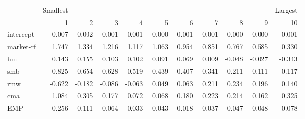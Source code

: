 \begin{tabular}{lrrrrrrrrrr}
      & \multicolumn{1}{l}{Smallest} & \multicolumn{1}{c}{-} & \multicolumn{1}{c}{-} & \multicolumn{1}{c}{-} & \multicolumn{1}{c}{-} & \multicolumn{1}{c}{-} & \multicolumn{1}{c}{-} & \multicolumn{1}{c}{-} & \multicolumn{1}{c}{-} & \multicolumn{1}{l}{Largest} \\
      & 1     & 2     & 3     & 4     & 5     & 6     & 7     & 8     & 9     & 10 \\
intercept & -0.007 & -0.002 & -0.001 & -0.001 & 0.000 & -0.001 & 0.001 & 0.000 & 0.000 & 0.001 \\
market-rf & 1.747 & 1.334 & 1.216 & 1.117 & 1.063 & 0.954 & 0.851 & 0.767 & 0.585 & 0.330 \\
hml   & 0.143 & 0.155 & 0.103 & 0.102 & 0.091 & 0.069 & 0.009 & -0.048 & -0.027 & -0.343 \\
smb   & 0.825 & 0.654 & 0.628 & 0.519 & 0.439 & 0.407 & 0.341 & 0.211 & 0.111 & 0.117 \\
rmw   & -0.622 & -0.182 & -0.086 & -0.063 & 0.049 & 0.063 & 0.211 & 0.234 & 0.196 & 0.140 \\
cma   & 1.084 & 0.305 & 0.177 & 0.072 & 0.068 & 0.180 & 0.223 & 0.214 & 0.162 & 0.325 \\
EMP   & -0.256 & -0.111 & -0.064 & -0.033 & -0.043 & -0.018 & -0.037 & -0.047 & -0.048 & -0.078 \\
\end{tabular}%
